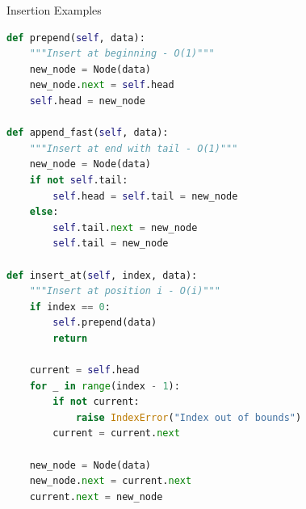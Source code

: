 \documentclass[aspectratio=169,xcolor=dvipsnames]{beamer}
\begin{document}
\begin{frame}[fragile]{Insertion Examples}
\begin{lstlisting}[language=Python, basicstyle=\tiny\ttfamily]
def prepend(self, data):
    """Insert at beginning - O(1)"""
    new_node = Node(data)
    new_node.next = self.head
    self.head = new_node

def append_fast(self, data):
    """Insert at end with tail - O(1)"""
    new_node = Node(data)
    if not self.tail:
        self.head = self.tail = new_node
    else:
        self.tail.next = new_node
        self.tail = new_node

def insert_at(self, index, data):
    """Insert at position i - O(i)"""
    if index == 0:
        self.prepend(data)
        return

    current = self.head
    for _ in range(index - 1):
        if not current:
            raise IndexError("Index out of bounds")
        current = current.next

    new_node = Node(data)
    new_node.next = current.next
    current.next = new_node
\end{lstlisting}
\end{frame}
\end{document}
